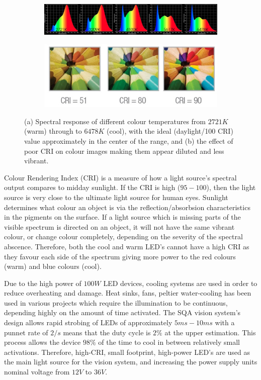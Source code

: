\documentclass[fleqn,twoside]{article}
\begin{document}
\begin{figure}[h]
	\centering
	\begin{subfigure}{\textwidth}
		\centering
		\includegraphics[width=\linewidth]{temp_response.jpg}
		\caption{}
		\label{fig:temp_response}
	\end{subfigure}%

	\begin{subfigure}{\textwidth}
		\centering
		\includegraphics[width=0.8\linewidth]{cri.jpg}
		\caption{}
		\label{fig:cri}
	\end{subfigure}%
	\caption{(a) Spectral response of different colour temperatures from $2721K$ (warm) through to $6478K$ (cool), with the ideal (daylight/100 CRI) value approximately in the center of the range, and (b) the effect of poor CRI on colour images making them appear diluted and less vibrant.}
	\label{}
\end{figure}


Colour Rendering Index (CRI) is a measure of how a light source's spectral output compares to midday sunlight. If the CRI is high ($95-100$), then the light source is very close to the ultimate light source for human eyes. Sunlight determines what colour an object is via the reflection/absorbsion characteristics in the pigments on the surface. If a light source which is missing parts of the visible spectrum is directed on an object, it will not have the same vibrant colour, or change colour completely, depending on the severity of the spectral abscence. Therefore, both the cool and warm LED's cannot have a high CRI as they favour each side of the spectrum giving more power to the red colours (warm) and blue colours (cool).

Due to the high power of $100W$ LED devices, cooling systems are used in order to reduce overheating and damage. Heat sinks, fans, peltier water-cooling has been used in various projects which require the illumination to be continuous, depending highly on the amount of time activated. The SQA vision system's design allows rapid strobing of LEDs of approximately $5ms-10ms$ with a punnet rate of $2/s$ means that the duty cycle is $2\%$ at the upper estimation. This process allows the device $98\%$ of the time to cool in between relatively small activations. Therefore, high-CRI, small footprint, high-power LED's are used as the main light source for the vision system, and increasing the power supply units nominal voltage from $12V$ to $36V$.
\end{document}
